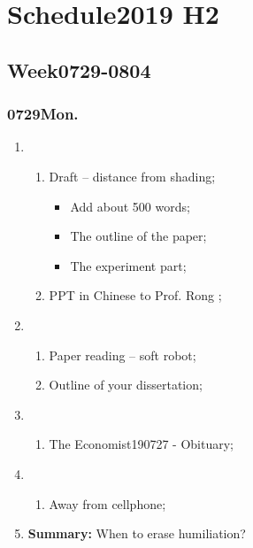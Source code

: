 \section{Schedule2019 H2}
\subsection{Week0729-0804}
\subsubsection{0729Mon.}
\begin{enumerate}
	\item \ncquaone
	\begin{enumerate}[(1)]
		\item Draft -- distance from shading;\rightundoneBlack
		\begin{itemize}
			\item Add about 500 words;
			\item The outline of the paper;
			\item The experiment part; 
		\end{itemize}
		\item PPT in Chinese to Prof. Rong ;\rightundoneBlack
	\end{enumerate}
	
	\item \ncquatwo	
	\begin{enumerate}[(1)]
		\item Paper reading -- soft robot;\rightundoneBlack
		\item Outline of your dissertation;\rightundoneBlack
	\end{enumerate}
	
	\item \ncquathree
	\begin{enumerate}[(1)]
		\item The Economist190727 - Obituary;\rightdone
	\end{enumerate}
	
	\item \ncquafour	
	\begin{enumerate}[(1)]
		\item Away from cellphone;\rightundoneBlack
	\end{enumerate}
	\item \textbf{Summary:} When to erase humiliation?
\end{enumerate}
